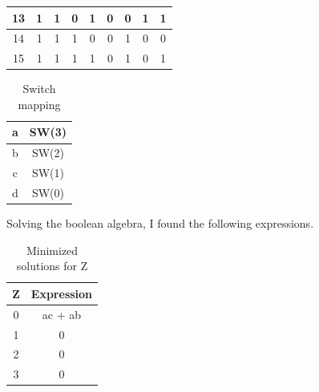 \documentclass{article}
\begin{document}
\begin{table}[htbp]
\begin{tabular}{|c|c|c|c|c|c|c|c|c|}
    \hline
    13    & \cellcolor[rgb]{ .851,  .851,  .851}1 & \cellcolor[rgb]{ .851,  .851,  .851}1 & \cellcolor[rgb]{ .851,  .851,  .851}0 & \cellcolor[rgb]{ .851,  .851,  .851}1 & \cellcolor[rgb]{ .71,  .902,  .635}0 & \cellcolor[rgb]{ .71,  .902,  .635}0 & \cellcolor[rgb]{ .71,  .902,  .635}1 & \cellcolor[rgb]{ .71,  .902,  .635}1 \bigstrut\\
    \hline
    14    & \cellcolor[rgb]{ .851,  .851,  .851}1 & \cellcolor[rgb]{ .851,  .851,  .851}1 & \cellcolor[rgb]{ .851,  .851,  .851}1 & \cellcolor[rgb]{ .851,  .851,  .851}0 & \cellcolor[rgb]{ .71,  .902,  .635}0 & \cellcolor[rgb]{ .71,  .902,  .635}1 & \cellcolor[rgb]{ .71,  .902,  .635}0 & \cellcolor[rgb]{ .71,  .902,  .635}0 \bigstrut\\
    \hline
    15    & \cellcolor[rgb]{ .851,  .851,  .851}1 & \cellcolor[rgb]{ .851,  .851,  .851}1 & \cellcolor[rgb]{ .851,  .851,  .851}1 & \cellcolor[rgb]{ .851,  .851,  .851}1 & \cellcolor[rgb]{ .71,  .902,  .635}0 & \cellcolor[rgb]{ .71,  .902,  .635}1 & \cellcolor[rgb]{ .71,  .902,  .635}0 & \cellcolor[rgb]{ .71,  .902,  .635}1 \bigstrut\\
    \hline
    \end{tabular}%
  \label{tab:T02A}%
\end{table}%

\begin{table}[htbp]
  \centering
  \caption{Switch mapping}
    \begin{tabular}{|c|c|}
    \hline
    a     & SW(3) \bigstrut\\
    \hline
    b     & SW(2) \bigstrut\\
    \hline
    c     & SW(1) \bigstrut\\
    \hline
    d     & SW(0) \bigstrut\\
    \hline
    \end{tabular}%
  \label{tab:T02SW}%
\end{table}%

\clearpage
Solving the boolean algebra, I found the following expressions.

\begin{table}[htbp]
  \centering
  \caption{Minimized solutions for Z}
    \begin{tabular}{|c|c|}
    \hline
    Z     & Expression \bigstrut\\
    \hline
    0     & \cellcolor[rgb]{ .71,  .902,  .635}ac + ab \bigstrut\\
    \hline
    1     & \cellcolor[rgb]{ .71,  .902,  .635}0 \bigstrut\\
    \hline
    2     & \cellcolor[rgb]{ .71,  .902,  .635}0 \bigstrut\\
    \hline
    3     & \cellcolor[rgb]{ .71,  .902,  .635}0 \bigstrut\\
    \hline
    \end{tabular}%
  \label{tab:T02Zexpressions}%
\end{table}%
\end{document}
